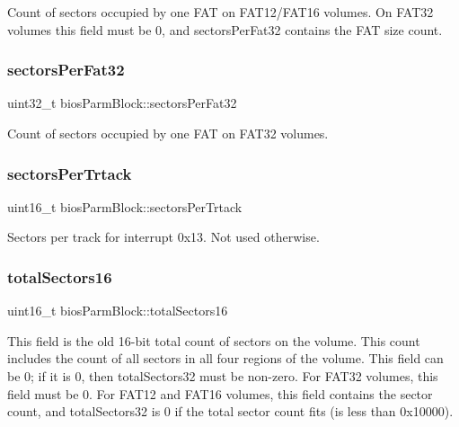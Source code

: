 Count of sectors occupied by one F\+AT on F\+A\+T12/\+F\+A\+T16 volumes. On F\+A\+T32 volumes this field must be 0, and sectors\+Per\+Fat32 contains the F\+AT size count. \mbox{\label{structbios_parm_block_ad80429df03a6b80f79b18cb6e1008d64}} 
\subsubsection{\texorpdfstring{sectors\+Per\+Fat32}{sectorsPerFat32}}
{\footnotesize\ttfamily uint32\+\_\+t bios\+Parm\+Block\+::sectors\+Per\+Fat32}

Count of sectors occupied by one F\+AT on F\+A\+T32 volumes. \mbox{\label{structbios_parm_block_a7c27cb7f66c2c9d5266d896e8df227c7}} 
\subsubsection{\texorpdfstring{sectors\+Per\+Trtack}{sectorsPerTrtack}}
{\footnotesize\ttfamily uint16\+\_\+t bios\+Parm\+Block\+::sectors\+Per\+Trtack}

Sectors per track for interrupt 0x13. Not used otherwise. \mbox{\label{structbios_parm_block_a686c686fde2fb109bea120f2f434db87}} 
\subsubsection{\texorpdfstring{total\+Sectors16}{totalSectors16}}
{\footnotesize\ttfamily uint16\+\_\+t bios\+Parm\+Block\+::total\+Sectors16}

This field is the old 16-\/bit total count of sectors on the volume. This count includes the count of all sectors in all four regions of the volume. This field can be 0; if it is 0, then total\+Sectors32 must be non-\/zero. For F\+A\+T32 volumes, this field must be 0. For F\+A\+T12 and F\+A\+T16 volumes, this field contains the sector count, and total\+Sectors32 is 0 if the total sector count fits (is less than 0x10000). \mbox{\label{structbios_parm_block_abead42e130c40e2aa535202e7cb07578}} 
